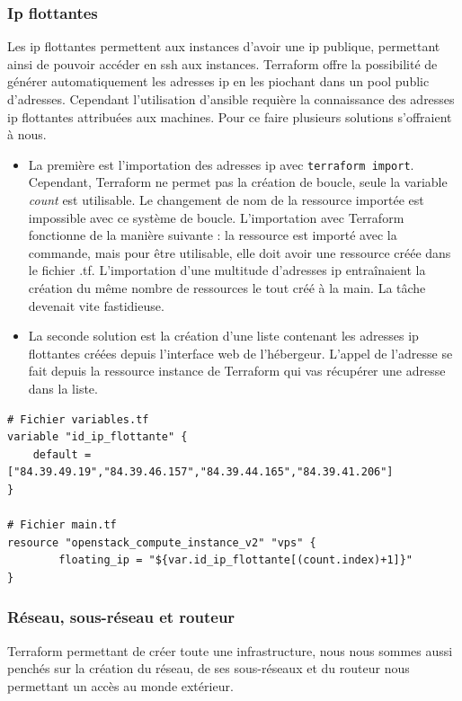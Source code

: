 \documentclass[]{article}
\begin{document}
\subsubsection{Ip flottantes}\label{ip-flottantes}

Les ip flottantes permettent aux instances d'avoir une ip publique, permettant ainsi de pouvoir accéder en ssh aux instances. Terraform
offre la possibilité de générer automatiquement les adresses ip en les
piochant dans un pool public d'adresses. Cependant l'utilisation
d'ansible requière la connaissance des adresses ip flottantes attribuées
aux machines. Pour ce faire plusieurs solutions s'offraient à nous. 
\begin{itemize}
\item La première est l'importation des adresses ip avec
\texttt{terraform\ import}. Cependant, Terraform ne permet pas la
création de boucle, seule la variable \emph{count} est utilisable. Le
changement de nom de la ressource importée est impossible avec ce
système de boucle. L'importation avec Terraform fonctionne de la manière
suivante : la ressource est importé avec la commande, mais pour être
utilisable, elle doit avoir une ressource créée dans le fichier .tf.
L'importation d'une multitude d'adresses ip entraînaient la création du
même nombre de ressources le tout créé à la main. La tâche devenait vite
fastidieuse. 
\item La seconde solution est la création d'une liste contenant
les adresses ip flottantes créées depuis l'interface web de l'hébergeur.
L'appel de l'adresse se fait depuis la ressource instance de Terraform
qui vas récupérer une adresse dans la liste.
\end{itemize}

\begin{verbatim}
# Fichier variables.tf
variable "id_ip_flottante" {
    default = ["84.39.49.19","84.39.46.157","84.39.44.165","84.39.41.206"]
}

# Fichier main.tf
resource "openstack_compute_instance_v2" "vps" {
        floating_ip = "${var.id_ip_flottante[(count.index)+1]}"
}
\end{verbatim}

\subsubsection{Réseau, sous-réseau et
routeur}\label{ruxe9seau-sous-ruxe9seau-et-routeur}

Terraform permettant de créer toute une infrastructure, nous nous sommes
aussi penchés sur la création du réseau, de ses sous-réseaux et du
routeur nous permettant un accès au monde extérieur.
\end{document}
